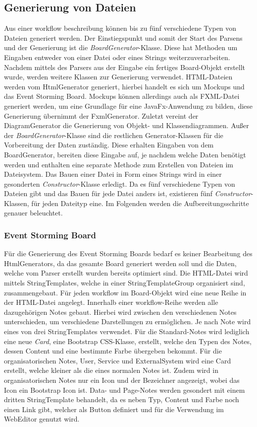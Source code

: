 \subsection{Generierung von Dateien}\label{subsec:generierung-von-dateien}
Aus einer workflow beschreibung können bis zu fünf verschiedene Typen von Dateien generiert werden.
Der Einstiegspunkt und somit der Start des Parsens und der Generierung ist die \textit{BoardGenerator}-Klasse.
Diese hat Methoden um Eingaben entweder von einer Datei oder eines Strings weiterzuverarbeiten.
Nachdem mittels des Parsers aus der Eingabe ein fertiges Board-Objekt erstellt wurde, werden weitere Klassen zur Generierung verwendet.
HTML-Dateien werden vom HtmlGenerator generiert, hierbei handelt es sich um Mockups und das Event Storming Board.
Mockups können allerdings auch als FXML-Datei generiert werden, um eine Grundlage für eine JavaFx-Anwendung zu bilden, diese Generierung
übernimmt der FxmlGenerator.
Zuletzt vereint der DiagramGenerator die Generierung von Objekt- und Klassendiagrammen.
Außer der \textit{BoardGenerator}-Klasse sind die restlichen Generator-Klassen für die Vorbereitung der Daten zuständig.
Diese erhalten Eingaben von dem BoardGenerator, bereiten diese Eingabe auf, je nachdem welche Daten benötigt werden und enthalten eine
separate Methode zum Erstellen von Dateien im Dateisystem.
Das Bauen einer Datei in Form eines Strings wird in einer gesonderten \textit{Constructor}-Klasse erledigt.
Da es fünf verschiedene Typen von Dateien gibt und das Bauen für jede Datei anders ist, existieren fünf \textit{Constructor}-Klassen, für jeden Dateityp eine.
Im Folgenden werden die Aufbereitungsschritte genauer beleuchtet.

\subsubsection{Event Storming Board}
Für die Generierung des Event Storming Boards bedarf es keiner Bearbeitung des HtmlGenerators, da das gesamte Board generiert werden soll und die Daten,
welche vom Parser erstellt wurden bereits optimiert sind.
Die HTML-Datei wird mittels StringTemplates, welche in einer StringTemplateGroup organisiert sind, zusammengebaut.
Für jeden workflow im Board-Objekt wird eine neue Reihe in der HTML-Datei angelegt.
Innerhalb einer workflow-Reihe werden alle dazugehörigen Notes gebaut.
Hierbei wird zwischen den verschiedenen Notes unterschieden, um verschiedene Darstellungen zu ermöglichen.
Je nach Note wird eines von drei StringTemplates verwendet.
Für die Standard-Notes wird lediglich eine neue \textit{Card}, eine Bootstrap CSS-Klasse, erstellt, welche den Typen des Notes, dessen Content und eine bestimmte Farbe übergeben bekommt.
Für die organisatorischen Notes, User, Service und ExternalSystem wird eine Card erstellt, welche kleiner als die eines normalen Notes ist.
Zudem wird in organisatorischen Notes nur ein Icon und der Bezeichner angezeigt, wobei das Icon ein Bootstrap Icon ist.
Data- und Page-Notes werden gesondert mit einem dritten StringTemplate behandelt, da es neben Typ, Content und Farbe noch einen Link gibt, welcher als Button definiert und für die Verwendung
im WebEditor genutzt wird.

